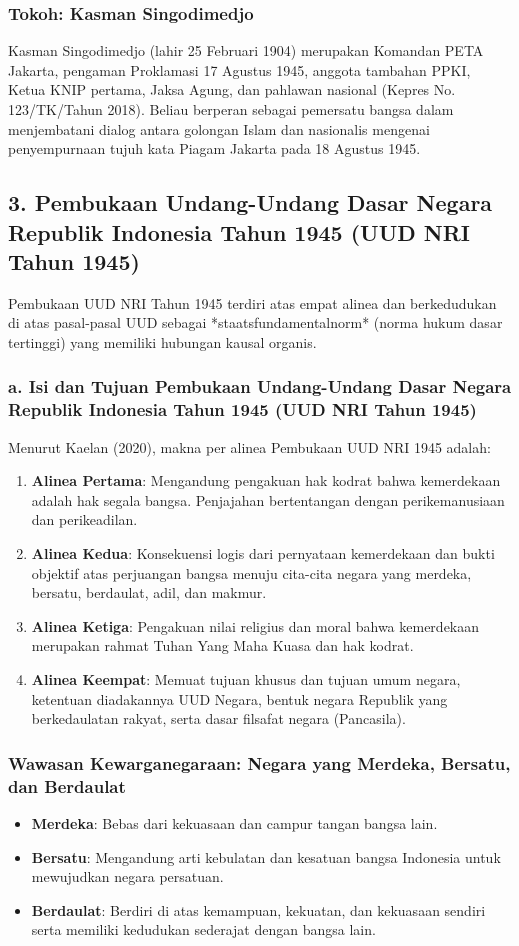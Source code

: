 \subsubsection{Tokoh: Kasman Singodimedjo}
Kasman Singodimedjo (lahir 25 Februari 1904) merupakan Komandan PETA Jakarta, pengaman Proklamasi 17 Agustus 1945, anggota tambahan PPKI, Ketua KNIP pertama, Jaksa Agung, dan pahlawan nasional (Kepres No. 123/TK/Tahun 2018). Beliau berperan sebagai pemersatu bangsa dalam menjembatani dialog antara golongan Islam dan nasionalis mengenai penyempurnaan tujuh kata Piagam Jakarta pada 18 Agustus 1945.


\subsection{3. Pembukaan Undang-Undang Dasar Negara Republik Indonesia Tahun 1945 (UUD NRI Tahun 1945)}
Pembukaan UUD NRI Tahun 1945 terdiri atas empat alinea dan berkedudukan di atas pasal-pasal UUD sebagai *staatsfundamentalnorm* (norma hukum dasar tertinggi) yang memiliki hubungan kausal organis.

\subsubsection{a. Isi dan Tujuan Pembukaan Undang-Undang Dasar Negara Republik Indonesia Tahun 1945 (UUD NRI Tahun 1945)}
Menurut Kaelan (2020), makna per alinea Pembukaan UUD NRI 1945 adalah:
\begin{enumerate}
    \item \textbf{Alinea Pertama}: Mengandung pengakuan hak kodrat bahwa kemerdekaan adalah hak segala bangsa. Penjajahan bertentangan dengan perikemanusiaan dan perikeadilan.
    \item \textbf{Alinea Kedua}: Konsekuensi logis dari pernyataan kemerdekaan dan bukti objektif atas perjuangan bangsa menuju cita-cita negara yang merdeka, bersatu, berdaulat, adil, dan makmur.
    \item \textbf{Alinea Ketiga}: Pengakuan nilai religius dan moral bahwa kemerdekaan merupakan rahmat Tuhan Yang Maha Kuasa dan hak kodrat.
    \item \textbf{Alinea Keempat}: Memuat tujuan khusus dan tujuan umum negara, ketentuan diadakannya UUD Negara, bentuk negara Republik yang berkedaulatan rakyat, serta dasar filsafat negara (Pancasila).
\end{enumerate}

\subsubsection{Wawasan Kewarganegaraan: Negara yang Merdeka, Bersatu, dan Berdaulat}
\begin{itemize}
    \item \textbf{Merdeka}: Bebas dari kekuasaan dan campur tangan bangsa lain.
    \item \textbf{Bersatu}: Mengandung arti kebulatan dan kesatuan bangsa Indonesia untuk mewujudkan negara persatuan.
    \item \textbf{Berdaulat}: Berdiri di atas kemampuan, kekuatan, dan kekuasaan sendiri serta memiliki kedudukan sederajat dengan bangsa lain.
\end{itemize}

